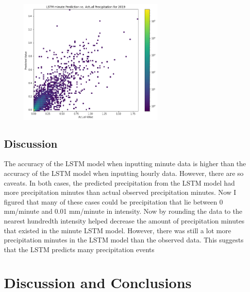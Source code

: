 \documentclass[11pt]{report}
\begin{document}
\begin{figure}[bh!]
	\centering
	\includegraphics[width = 0.65\textwidth]{Figures/LSTM_minute_compare.png}
	\caption[LSTM minute prediction vs. actual data ]{\label{LSTM_minute_compare}
	}
\end{figure}
\clearpage
\subsection{Discussion}
The accuracy of the LSTM model when inputting minute data is higher than the accuracy of the LSTM model when inputting hourly data. However, there are so caveats. In both cases, the predicted precipitation from the LSTM model had more precipitation minutes than actual observed precipitation minutes. Now I figured that many of these cases could be precipitation that lie between 0 mm/minute and 0.01 mm/minute in intensity. Now by rounding the data to the nearest hundredth intensity helped decrease the amount of precipitation minutes that existed in the minute LSTM model. However, there was still a lot more precipitation minutes in the LSTM model than the observed data. This suggests that the LSTM predicts many precipitation events 



\clearpage


\section{Discussion and Conclusions}\label{sec:conclusions}
\end{document}
